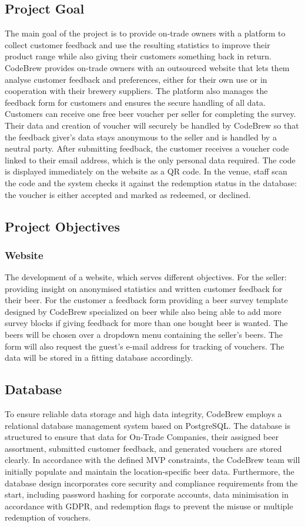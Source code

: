 \documentclass[a4paper,12pt]{article}
\begin{document}
\subsection{Project Goal}
The main goal of the project is to provide on-trade owners with a platform to collect customer feedback and use the resulting statistics to improve their product range while also giving their customers something back in return.
CodeBrew provides on-trade owners with an outsourced website that lets them analyse customer feedback and preferences, either for their own use or in cooperation with their brewery suppliers.
The platform also manages the feedback form for customers and ensures the secure handling of all data.
Customers can receive one free beer voucher per seller for completing the survey.
Their data and creation of voucher will securely be handled by CodeBrew so that the feedback giver's data stays anonymous to the seller and is handled by a neutral party.
After submitting feedback, the customer receives a voucher code linked to their email address, which is the only personal data required.
The code is displayed immediately on the website as a QR code.
In the venue, staff scan the code and the system checks it against the redemption status in the database: the voucher is either accepted and marked as redeemed, or declined.

\subsection{Project Objectives}

\subsubsection{Website}
The development of a website, which serves different objectives.
For the seller: providing insight on anonymised statistics and written customer feedback for their beer.
For the customer a feedback form providing a beer survey template designed by CodeBrew specialized on beer while also being able to add more survey blocks if giving feedback for more than one bought beer is wanted.
The beers will be chosen over a dropdown menu containing the seller's beers.
The form will also request the guest's e-mail address for tracking of vouchers.
The data will be stored in a fitting database accordingly.

\subsection{Database}
To ensure reliable data storage and high data integrity, CodeBrew employs a relational database management system based on PostgreSQL.
The database is structured to ensure that data for On-Trade Companies, their assigned beer assortment, submitted customer feedback,
and generated vouchers are stored clearly. In accordance with the defined MVP constraints,
the CodeBrew team will initially populate and maintain the location-specific beer data. Furthermore,
the database design incorporates core security and compliance requirements from the start, including password hashing for corporate accounts,
data minimisation in accordance with GDPR, and redemption flags to prevent the misuse or multiple redemption of vouchers.
\end{document}
